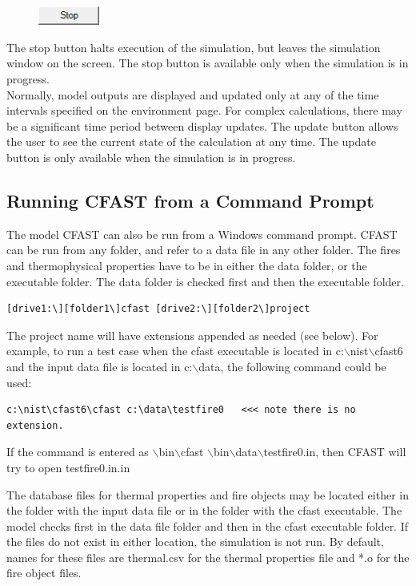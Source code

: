 \begin{figure}
  \includegraphics[width=0.79in]{FIGURES/Running_CFAST/Stop_Button}
\end{figure}

 The stop button halts execution of the simulation, but leaves the simulation window on the screen.  The stop button is available only when the simulation is in progress. \\

Normally, model outputs are displayed and updated only at any of the time intervals specified on the environment page. For complex calculations, there may be a significant time period between display updates. The update button allows the user to see the current state of the calculation at any time. The update button is only available when the simulation is in progress.

\subsection{Running CFAST from a Command Prompt}

The model CFAST can also be run from a Windows command prompt.  CFAST can be run from any folder, and refer to a data file in any other folder. The fires and thermophysical properties have to be in either the data folder, or the executable folder. The data folder is checked first and then the executable folder.

\begin{lstlisting}
[drive1:\][folder1\]cfast [drive2:\][folder2\]project
\end{lstlisting}

The project name will have extensions appended as needed (see below). For example, to run a test case when the cfast executable is located in c:$\backslash$nist$\backslash$cfast6 and the input data file is located in c:$\backslash$data, the following command could be used:

\begin{lstlisting}
c:\nist\cfast6\cfast c:\data\testfire0   <<< note there is no extension.
\end{lstlisting}

If the command is entered as $\backslash$bin$\backslash$cfast $\backslash$bin$\backslash$data$\backslash$testfire0.in, then CFAST will try to open testfire0.in.in

The database files for thermal properties and fire objects may be located either in the folder with the input data file or in the folder with the cfast executable. The model checks first in the data file folder and then in the cfast executable folder.  If the files do not exist in either location, the simulation is not run. By default, names for these files are thermal.csv for the thermal properties file and *.o for the fire object files.


